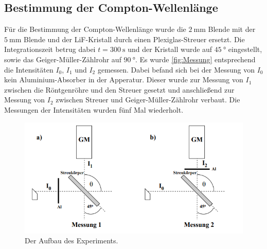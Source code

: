 \subsection{Bestimmung der Compton-Wellenlänge}
Für die Bestimmung der Compton-Wellenlänge wurde die $\SI{2}{\milli\meter}$ Blende mit der $\SI{5}{\milli\meter}$ Blende und
der LiF-Kristall durch einen Plexiglas-Streuer ersetzt. Die Integrationszeit betrug dabei $t = \SI{300}{\second}$ und der Kristall
wurde auf $\SI{45}{\degree}$ eingestellt, sowie das Geiger-Müller-Zählrohr auf $\SI{90}{\degree}$.
Es wurde \autoref{fig:Messung} entsprechend die Intensitäten $I_0$, $I_1$ und $I_2$ gemessen.
Dabei befand sich bei der Messung von $I_0$ kein Aluminium-Absorber in der Apperatur. Dieser wurde zur Messung von $I_1$
zwischen die Röntgenröhre und den Streuer gesetzt und anschließend zur Messung von $I_2$ zwischen Streuer und
Geiger-Müller-Zählrohr verbaut. Die Messungen der Intensitäten wurden fünf Mal wiederholt.
\begin{figure}[H]
    \centering
    \includegraphics[scale=1]{content/Messung.png}
    \caption{Der Aufbau des Experiments.\cite{sample}}
    \label{fig:Messung}
\end{figure}

